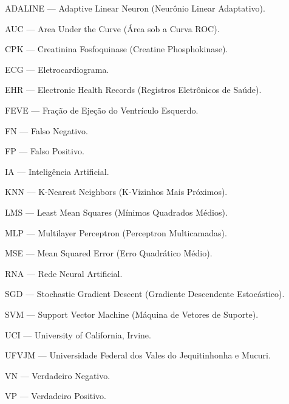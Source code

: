 \begin{siglas}

    ADALINE --- Adaptive Linear Neuron (Neurônio Linear Adaptativo).

    AUC --- Area Under the Curve (Área sob a Curva ROC).

    CPK --- Creatinina Fosfoquinase (Creatine Phosphokinase).

    ECG --- Eletrocardiograma.

    EHR --- Electronic Health Records (Registros Eletrônicos de Saúde).

    FEVE --- Fração de Ejeção do Ventrículo Esquerdo.

    FN --- Falso Negativo.

    FP --- Falso Positivo.

    IA --- Inteligência Artificial.

    KNN --- K-Nearest Neighbors (K-Vizinhos Mais Próximos).

    LMS --- Least Mean Squares (Mínimos Quadrados Médios).

    MLP --- Multilayer Perceptron (Perceptron Multicamadas).

    MSE --- Mean Squared Error (Erro Quadrático Médio).

    RNA --- Rede Neural Artificial.

    SGD --- Stochastic Gradient Descent (Gradiente Descendente Estocástico).

    SVM --- Support Vector Machine (Máquina de Vetores de Suporte).

    UCI --- University of California, Irvine.

    UFVJM --- Universidade Federal dos Vales do Jequitinhonha e Mucuri.

    VN --- Verdadeiro Negativo.

    VP --- Verdadeiro Positivo.

\end{siglas}
